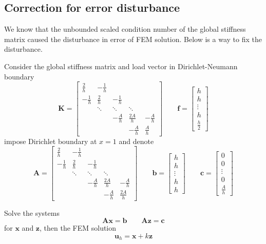 \documentclass[12pt]{article}
\begin{document}
\subsection{Correction for error disturbance}
We know that the unbounded scaled condition number of the global stiffness matrix caused the disturbance in error of FEM solution. Below is a way to fix the disturbance.

Consider the global stiffness matrix and load vector in Dirichlet-Neumann boundary
\[
\textbf{K}=
\begin{bmatrix}
\frac{2}{h} & -\frac{1}{h} \\
-\frac{1}{h} & \frac{2}{h} & -\frac{1}{h} \\
& \ddots & \ddots & \ddots \\
&& -\frac{A}{h} & \frac{2A}{h} & -\frac{A}{h} \\
&&& -\frac{A}{h} & \frac{A}{h}
\end{bmatrix}
\quad \quad
\textbf{f}=
\begin{bmatrix}
h \\
h \\
\vdots \\
h \\
\frac{h}{2}
\end{bmatrix}
\]
impose Dirichlet boundary at $x=1$ and denote
\[
\textbf{A}=
\begin{bmatrix}
\frac{2}{h} & -\frac{1}{h} \\
-\frac{1}{h} & \frac{2}{h} & -\frac{1}{h} \\
& \ddots & \ddots & \ddots \\
&& -\frac{A}{h} & \frac{2A}{h} & -\frac{A}{h} \\
&&& -\frac{A}{h} & \frac{2A}{h}
\end{bmatrix}
\quad \quad
\textbf{b}=
\begin{bmatrix}
h \\
h \\
\vdots \\
h \\
h
\end{bmatrix}
\quad \quad
\textbf{c}=
\begin{bmatrix}
0 \\
0 \\
\vdots \\
0 \\
\frac{A}{h}
\end{bmatrix}
\]

Solve the systems
$$\textbf{Ax}=\textbf{b} \quad \quad \textbf{Az}=\textbf{c}$$
for $\textbf{x}$ and $\textbf{z}$, then the FEM solution
$$\textbf{u}_{h}=\textbf{x}+k\textbf{z}$$
\end{document}
